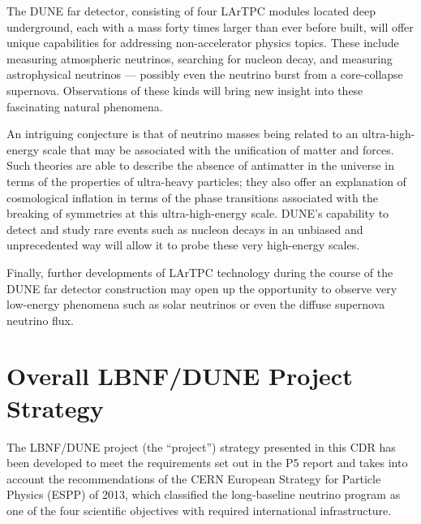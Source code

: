 The DUNE far detector, consisting of four LArTPC modules located deep underground, each with a mass forty times %
larger than ever before built,  
will offer unique capabilities for addressing %
non-accelerator physics topics. These include measuring atmospheric neutrinos, searching for nucleon decay, and measuring astrophysical neutrinos --- possibly even %
the neutrino burst %
from a core-collapse supernova. 
Observations of these kinds will bring new insight into these fascinating natural phenomena. 



An intriguing %
conjecture is that of neutrino masses being related to an %
ultra-high-energy scale that may be associated with the unification of matter and forces. Such theories are able to describe the absence of antimatter in the universe in terms of the properties of ultra-heavy particles; they also %
offer an explanation %
of cosmological inflation in terms of the phase transitions associated with the breaking of symmetries at this ultra-high-energy scale. DUNE's capability to detect and study rare events such as nucleon decays in an unbiased and unprecedented way will allow it to probe these very high-energy scales. 



Finally, further developments of LArTPC %
technology during the course of the DUNE far detector construction may open up the opportunity
to observe very low-energy phenomena such as solar neutrinos or even the diffuse supernova neutrino flux.



\section{Overall LBNF/DUNE Project Strategy} %

The LBNF/DUNE project (the ``project'') strategy presented in this CDR has been developed to meet the requirements 
set out in the P5 report and %
takes into account the recommendations of the CERN European Strategy for Particle 
Physics (ESPP) of 2013, which classified the long-baseline neutrino program as 
one of the four scientific objectives with required international infrastructure.

